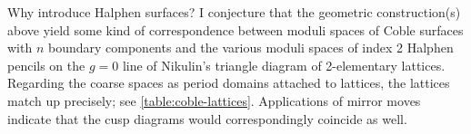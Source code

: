 \documentclass[../main.tex]{subfiles}
\begin{document}
\begin{remark}
Why introduce Halphen surfaces? I conjecture that the geometric construction(s) above yield some kind of correspondence between moduli spaces of Coble surfaces with $n$ boundary components and the various moduli spaces of index 2 Halphen pencils on the $g=0$ line of Nikulin's triangle diagram of 2-elementary lattices. Regarding the coarse spaces as period domains attached to lattices, the lattices match up precisely; see \cref{table:coble-lattices}. Applications of mirror moves indicate that the cusp diagrams would correspondingly coincide as well.
\end{remark}
\end{document}
